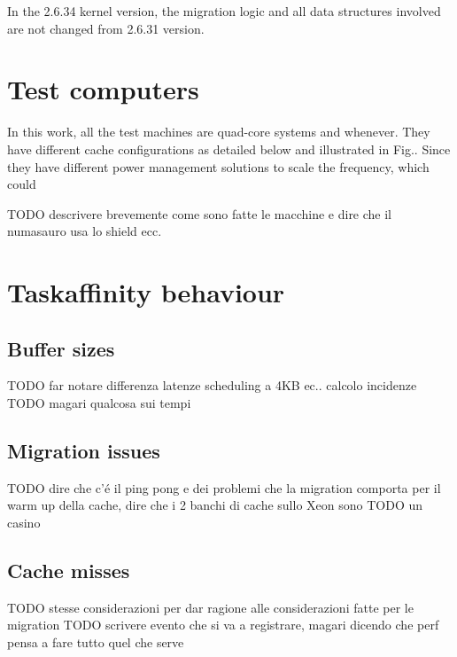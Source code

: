 In the 2.6.34 kernel version, the migration logic and all data structures involved are not changed from 2.6.31 version.

\section{Test computers}

In this work, all the test machines are quad-core 
systems and whenever. They have different cache configurations
as detailed below and illustrated in Fig.. Since they have different
power management solutions to scale the frequency, which could

TODO descrivere brevemente come sono fatte le macchine e dire che il numasauro usa lo shield ecc.

\section{Taskaffinity behaviour}

\subsection{Buffer sizes}

TODO far notare differenza latenze scheduling a 4KB ec.. calcolo incidenze
TODO magari qualcosa sui tempi 

\subsection{Migration issues}
TODO dire che c'\'e il ping pong e dei problemi che la migration comporta per il warm up della cache, dire che i 2 banchi di cache sullo Xeon sono
TODO un casino

\subsection{Cache misses}

TODO stesse considerazioni per dar ragione alle considerazioni fatte per le migration
TODO scrivere evento che si va a registrare, magari dicendo che perf pensa a fare tutto quel che serve 

